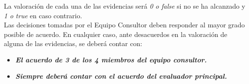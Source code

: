 \begin{itemize}
	La valoración de cada una de las evidencias será \textit{0 o false} si no se
	ha alcanzado y \textit{1 o true} en caso contrario.\\

	Las decisiones tomadas por el Equipo Consultor deben responder al mayor
	grado posible de acuerdo. En cualquier caso, ante desacuerdos en la
	valoración de alguna de las evidencias, se deberá contar con:
	\begin{itemize}
		\item \textbf{\textit{El acuerdo de 3 de los 4 miembros del equipo consultor.}}
		\item \textbf{\textit{Siempre deberá contar con el acuerdo del evaluador principal.}}
	\end{itemize}
\end{itemize}

